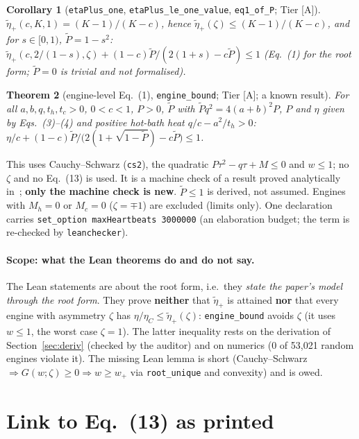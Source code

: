 \documentclass[10pt]{article}
\newcommand{\tier}[1]{\textsf{[#1]}}
\newcommand{\tA}{\tier{A}}
\newcommand{\lean}[1]{\texttt{#1}}
\newcommand{\eC}{\eta_C}
\newcommand{\ep}{\tilde\eta_+}
\theoremstyle{plain}
\newtheorem{thm}{Theorem}
\newtheorem{cor}[thm]{Corollary}
\begin{document}
\begin{cor}[\lean{etaPlus\_one}, \lean{etaPlus\_le\_one\_value}, \lean{eq1\_of\_P}; Tier \tA{}]
$\ep(c,K,1)=(K-1)/(K-c)$, hence $\ep(\zeta)\le(K-1)/(K-c)$, and for $s\in[0,1)$, $\tilde P=1-s^2$: $\ep(c,2/(1-s),\zeta)+(1-c)\tilde P/(2(1+s)-c\tilde P)\le1$ (Eq.~(1) for the root form; $\tilde P=0$ is trivial and not formalised).
\end{cor}

\begin{thm}[engine-level Eq.~(1), \lean{engine\_bound}; Tier \tA{}; a known result]\label{thm:eng}
For all $a,b,q,t_h,t_c>0$, $0<c<1$, $P>0$, $\tilde P$ with $\tilde Pq^2=4(a+b)^2P$, $P$ and $\eta$ given by Eqs.~(3)--(4) and positive hot-bath heat $q/c-a^2/t_h>0$:
$\eta/c+(1-c)\tilde P/\bigl(2(1+\sqrt{1-\tilde P})-c\tilde P\bigr)\le1$.
\end{thm}
\noindent This uses Cauchy--Schwarz (\lean{cs2}), the quadratic $P\tau^2-q\tau+M\le0$ and $w\le1$; no $\zeta$ and no Eq.~(13) is used. It is a machine check of a result proved analytically in~\cite{mafu,zhai}; \textbf{only the machine check is new}. $\tilde P\le1$ is derived, not assumed. Engines with $M_h=0$ or $M_c=0$ ($\zeta=\mp1$) are excluded (limits only). One declaration carries \lean{set\_option maxHeartbeats 3000000} (an elaboration budget; the term is re-checked by \texttt{leanchecker}).

\paragraph{Scope: what the Lean theorems do and do not say.} The Lean statements are about the root form, i.e.\ they \emph{state the paper's model through the root form}. They prove \textbf{neither} that $\ep$ is attained \textbf{nor} that every engine with asymmetry $\zeta$ has $\eta/\eC\le\ep(\zeta)$: \lean{engine\_bound} avoids $\zeta$ (it uses $w\le1$, the worst case $\zeta=1$). The latter inequality rests on the derivation of Section~\ref{sec:deriv} (checked by the auditor) and on numerics (0 of 53,021 random engines violate it). The missing Lean lemma is short (Cauchy--Schwarz $\Rightarrow G(w;\zeta)\ge0\Rightarrow w\ge w_+$ via \lean{root\_unique} and convexity) and is owed.

\section{Link to Eq.~(13) as printed}\label{sec:link}
\end{document}
